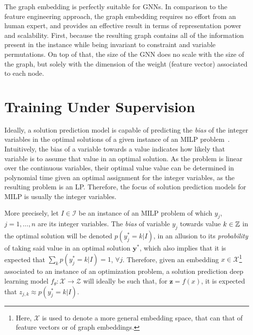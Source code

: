 The graph embedding is perfectly suitable for GNNs.
In comparison to the feature engineering approach, the graph embedding requires no effort from an human expert, and provides an effective result in terms of representation power and scalability.
First, because the resulting graph contains all of the information present in the instance while being invariant to constraint and variable permutations.
On top of that, the size of the GNN does no scale with the size of the graph, but solely with the dimension of the weight (feature vector) associated to each node.


\section{Training Under Supervision}

Ideally, a solution prediction model is capable of predicting the \emph{bias} of the integer variables in the optimal solutions of a given instance of an MILP problem~\cite{khalilMIPGNNDataDrivenFramework2022}.
Intuitively, the bias of a variable towards a value indicates how likely that variable is to assume that value in an optimal solution.
As the problem is linear over the continuous variables, their optimal value value can be determined in polynomial time given an optimal assignment for the integer variables, as the resulting problem is an LP.
Therefore, the focus of solution prediction models for MILP is usually the integer variables.

More precisely, let $I\in \mathcal{I}$ be an instance of an MILP problem of which $y_j$, $j=1,\ldots,n$ are its integer variables.
The \emph{bias} of variable $y_j$ towards value $k\in \mathbb{Z}$ in the optimal solution will be denoted $p(y_j^*=k|I)$, in an allusion to its \emph{probability} of taking said value in an optimal solution $\bm{y}^*$, which also implies that it is expected that $\sum_{k} p(y_j^*=k|I) = 1$, $\forall j$.
Therefore, given an embedding $x\in \mathcal{X}$\footnote{Here, $\mathcal{X}$ is used to denote a more general embedding space, that can that of feature vectors or of graph embeddings.} associated to an instance of an optimization problem, a solution prediction deep learning model $f_{\theta}: \mathcal{X} \longrightarrow \mathcal{Z}$ will ideally be such that, for $\bm{z}=f(x)$, it is expected that $z_{j,k}\approx p(y_j^*=k|I)$.

